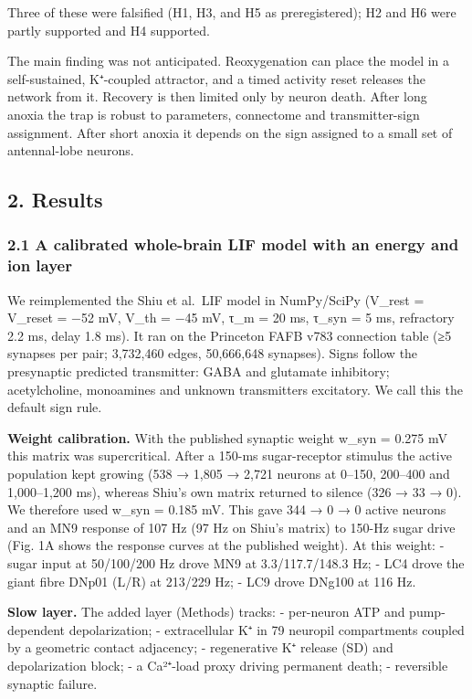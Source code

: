\documentclass[11pt]{article}
\begin{document}
Three of these were falsified (H1, H3, and H5 as preregistered); H2 and H6 were partly supported and H4 supported.

The main finding was not anticipated. Reoxygenation can place the model in a self-sustained, K⁺-coupled attractor, and a timed activity reset releases the network from it. Recovery is then limited only by neuron death. After long anoxia the trap is robust to parameters, connectome and transmitter-sign assignment. After short anoxia it depends on the sign assigned to a small set of antennal-lobe neurons.

\subsection{2. Results}\label{results}

\subsubsection{2.1 A calibrated whole-brain LIF model with an energy and ion layer}\label{a-calibrated-whole-brain-lif-model-with-an-energy-and-ion-layer}

We reimplemented the Shiu et al.~LIF model \cite{shiu2024} in NumPy/SciPy (V\_rest = V\_reset = −52 mV, V\_th = −45 mV, τ\_m = 20 ms, τ\_syn = 5 ms, refractory 2.2 ms, delay 1.8 ms). It ran on the Princeton FAFB v783 connection table (≥5 synapses per pair; 3,732,460 edges, 50,666,648 synapses). Signs follow the presynaptic predicted transmitter: GABA and glutamate inhibitory; acetylcholine, monoamines and unknown transmitters excitatory. We call this the default sign rule.

\textbf{Weight calibration.} With the published synaptic weight w\_syn = 0.275 mV this matrix was supercritical. After a 150-ms sugar-receptor stimulus the active population kept growing (538 → 1,805 → 2,721 neurons at 0--150, 200--400 and 1,000--1,200 ms), whereas Shiu's own matrix returned to silence (326 → 33 → 0). We therefore used w\_syn = 0.185 mV. This gave 344 → 0 → 0 active neurons and an MN9 response of 107 Hz (97 Hz on Shiu's matrix) to 150-Hz sugar drive (Fig. 1A shows the response curves at the published weight). At this weight:
- sugar input at 50/100/200 Hz drove MN9 at 3.3/117.7/148.3 Hz;
- LC4 drove the giant fibre DNp01 (L/R) at 213/229 Hz;
- LC9 drove DNg100 at 116 Hz.

\textbf{Slow layer.} The added layer (Methods) tracks:
- per-neuron ATP and pump-dependent depolarization;
- extracellular K⁺ in 79 neuropil compartments coupled by a geometric contact adjacency;
- regenerative K⁺ release (SD) and depolarization block;
- a Ca²⁺-load proxy driving permanent death;
- reversible synaptic failure.
\end{document}
